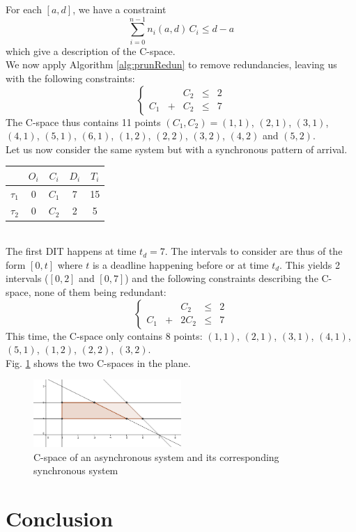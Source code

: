 \documentclass[times, 10pt,twocolumn, a4paper]{article}
\begin{document}
For each $[a, d]$, we have a constraint $$\sum_{i=0}^{n-1} n_i(a, d) \, C_i \leqslant d - a$$ which give a description of the C-space.\\

We now apply Algorithm \ref{alg:prunRedun} to remove redundancies, leaving us with the following constraints:
$$
\left\{
	\begin{array}{ccccc}
		& & C_2 & \leqslant & 2 \\
		C_1 & + & C_2 & \leqslant & 7
	\end{array}
\right.
$$
The C-space thus contains 11 points $(C_1, C_2) = (1, 1)$, $(2, 1)$, $(3, 1)$, $(4, 1)$, $(5, 1)$, $(6, 1)$, $(1, 2)$, $(2, 2)$, $(3, 2)$, $(4, 2)$ and $(5, 2)$.\\

Let us now consider the same system but with a synchronous pattern of arrival.

		\begin{center}
		\begin{tabular}{|r|c|c|c|c|}
		 \hline
		  & $O_i$ & $C_i$ & $D_i$ & $T_i$ \\
		 \hline
		 $\tau_1$ & 0 & $C_1$ & 7 & 15\\
		 \hline
		 $\tau_2$ & 0 & $C_2$ & 2 & 5\\
		 \hline
		\end{tabular}
		\end{center}
		~\\

The first DIT happens at time $t_d = 7$. The intervals to consider are thus of the form $[0, t]$ where $t$ is a deadline happening before or at time $t_d$. This yields 2 intervals ($[0, 2]$ and $[0, 7]$) and the following constraints describing the C-space, none of them being redundant:
$$
\left\{
	\begin{array}{ccccc}
		& & C_2 & \leqslant & 2 \\
		C_1 & + & 2 C_2 & \leqslant & 7
	\end{array}
\right.
$$
This time, the C-space only contains 8 points: $(1, 1)$, $(2, 1)$, $(3, 1)$, $(4, 1)$, $(5, 1)$, $(1, 2)$, $(2, 2)$, $(3, 2)$.\\

Fig. \ref{fig:cspaceComp} shows the two C-spaces in the plane.

\begin{figure}[h]
\begin{center}
	\includegraphics[width=0.5\textwidth]{figs/cspace_example.png}
	\caption{C-space of an asynchronous system and its corresponding synchronous system}
	\label{fig:cspaceComp}
\end{center}
\end{figure}

\section{Conclusion}



\end{document}
